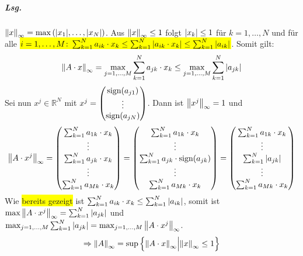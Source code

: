 \documentclass{scrreprt}
\newcommand\sign[1]{\text{sign}\qty(#1)}
\begin{document}
\begin{enumerate}[1)]
  \subparagraph{Lsg.} $\norm{x}_{\infty} = \max\qty(\abs{x_1}, \ldots, \abs{x_N})$.
  Aus $\norm{x}_{\infty} \leq 1$ folgt $\abs{x_k} \leq 1$ für $k = 1, \ldots, N$
  und für alle
  \colorbox{yellow}{$i = 1, \ldots, M \colon \sum_{k = 1}^N a_{ik} \cdot x_k
  \leq \sum_{k = 1}^N \abs{a_{ik} \cdot x_k} \leq \sum_{k = 1}^N \abs{a_{ik}}$}.
  Somit gilt:
  \[
    \norm{A \cdot x}_{\infty} = \max_{j = 1, \ldots, M} \sum_{k = 1}^N a_{jk} \cdot x_k
    \leq \max_{j = 1, \ldots, M} \sum_{k = 1}^N \abs{a_{jk}}
  \]
  Sei nun $x^j \in \mathbb{R}^N$ mit $x^j = \begin{pmatrix} \sign{a_{j1}} \\ \vdots \\ \sign{a_{jN}} \end{pmatrix}$.
  Dann ist $\norm{x^j}_{\infty} = 1$ und
  \[
    \norm{A \cdot x^j}_{\infty} = \begin{pmatrix}
      \sum_{k = 1}^N a_{1k} \cdot x_k \\
      \vdots \\
      \sum_{k = 1}^N a_{jk} \cdot x_k \\
      \vdots \\
      \sum_{k = 1}^N a_{Mk} \cdot x_k \\
    \end{pmatrix}
    = \begin{pmatrix}
      \sum_{k = 1}^N a_{1k} \cdot x_k \\
      \vdots \\
      \sum_{k = 1}^N a_{jk} \cdot \sign{a_{jk}} \\
      \vdots \\
      \sum_{k = 1}^N a_{Mk} \cdot x_k \\
    \end{pmatrix}
    = \begin{pmatrix}
      \sum_{k = 1}^N a_{1k} \cdot x_k \\
      \vdots \\
      \sum_{k = 1}^N \abs{a_{jk}} \\
      \vdots \\
      \sum_{k = 1}^N a_{Mk} \cdot x_k \\
    \end{pmatrix}
  \]
  Wie \colorbox{yellow}{bereits gezeigt} ist
  $\sum_{k = 1}^N a_{ik} \cdot x_k\leq \sum_{k = 1}^N \abs{a_{ik}}$,
  somit ist $\max\norm{A \cdot x^j}_{\infty} = \sum_{k = 1}^N \abs{a_{jk}}$
  und
  $\max_{j = 1, \ldots, M} \sum_{k = 1}^N \abs{a_{jk}} = \max_{j = 1, \ldots, M} \norm{A \cdot x^j}_{\infty}$.
  \[
    \Rightarrow \norm{A}_{\infty} = \sup\qty{\norm{A \cdot x}_{\infty} {\Big |} \norm{x}_{\infty} \leq 1 }
  \]
  \newpage


\end{enumerate}
\end{document}
